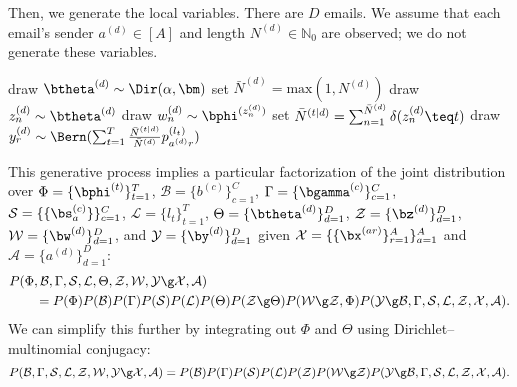 \documentclass[10pt,english,oneside]{article}
\begin{document}
\pagebreak

Then, we generate the local variables. There are $D$ emails. We assume
that each email's sender $a^{(d)} \in [A]$ and length $N^{(d)} \in
\mathbb{N}_0$ are observed; we do not generate these variables.

\begin{algorithm}[h]
  \begin{algorithmic}[1]
    \State draw $\btheta^{(d)} \sim \Dir(\alpha, \bm)$
    \State set $\bar{N}^{(d)} = \textrm{max}(1, N^{(d)})$
    \State draw $z_n^{(d)} \sim \btheta^{(d)}$
    \State draw $w_n^{(d)} \sim \bphi^{(z_n^{(d)})}$
    \EndIf
    \EndFor
    \State set $\bar{N}^{(t|d)} = \sum_{n=1}^{\bar{N}^{(d)}}
    \delta(z_n^{(d)} \teq t)$
    \EndFor
    \State draw $y_r^{(d)} \sim \Bern(    \sum_{t=1}^T \frac{\bar{N}^{(t|d)}}{\bar{N}^{(d)}}
    p^{(l_t)}_{a^{(d)}r})$
    \EndFor
    \EndFor
  \end{algorithmic}
\end{algorithm}

This generative process implies a particular factorization of the
joint distribution over $\Phi = \{ \bphi^{(t)} \}_{t=1}^T$,
$\mathcal{B} = \{ b^{(c)} \}_{c=1}^C$, $\Gamma = \{ \bgamma^{(c)}
\}_{c=1}^C$, $\mathcal{S} = \{ \{ \bs^{(c)}_a \} \}_{c=1}^C$,
$\mathcal{L} = \{ l_t\}_{t=1}^T$, $\Theta = \{ \btheta^{(d)}
\}_{d=1}^D$, $\mathcal{Z} = \{ \bz^{(d)} \}_{d=1}^D$, $\mathcal{W} =
\{ \bw^{(d)} \}_{d=1}^D$, and $\mathcal{Y} = \{ \by^{(d)} \}_{d=1}^D$
given $\mathcal{X} = \{ \{
\bx^{(ar)} \}_{r=1}^A \}_{a=1}^A$ and 
$\mathcal{A} = \{ a^{(d)} \}_{d=1}^D$:
\begin{align}
  &P(\Phi, \mathcal{B}, \Gamma, \mathcal{S}, \mathcal{L}, \Theta,
  \mathcal{Z}, \mathcal{W}, \mathcal{Y} \g \mathcal{X}, \mathcal{A})
  \notag \\
  &\qquad = P(\Phi) P(\mathcal{B}) P(\Gamma) P(\mathcal{S}) P(\mathcal{L})
  P(\Theta) P(\mathcal{Z} \g \Theta) P(\mathcal{W} \g \mathcal{Z},
  \Phi) P(\mathcal{Y} \g \mathcal{B}, \Gamma, \mathcal{S},
  \mathcal{L}, \mathcal{Z}, \mathcal{X}, \mathcal{A}).
  \end{align}
We can simplify this further by integrating out $\Phi$ and $\Theta$
using Dirichlet--multinomial conjugacy:
\begin{equation}
  P(\mathcal{B}, \Gamma, \mathcal{S}, \mathcal{L},
  \mathcal{Z}, \mathcal{W}, \mathcal{Y} \g \mathcal{X}, \mathcal{A}) =
  P(\mathcal{B}) P(\Gamma) P(\mathcal{S}) P(\mathcal{L})
  P(\mathcal{Z})
  P(\mathcal{W} \g \mathcal{Z}) P(\mathcal{Y} \g \mathcal{B}, \Gamma,
  \mathcal{S},
    \mathcal{L}, \mathcal{Z}, \mathcal{X}, \mathcal{A}).
  \end{equation}
\end{document}
